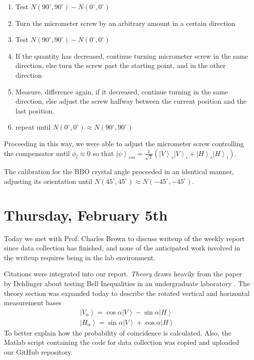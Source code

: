 \documentclass[letter,scriptaddress,twocolumn, prl,showkeys]{revtex4}
\newcommand{\ket}[1]{\left| #1 \right\rangle}
\newcommand{\degree}{^\circ}
\begin{document}
\begin{enumerate}
    \item Test $N(90 \degree, 90 \degree) - N(0\degree, 0\degree)$
    \item Turn the micrometer screw by an arbitrary amount in a certain direction
    \item Test $N(90 \degree, 90 \degree) - N(0\degree, 0\degree)$
    \item If the quantity has decreased, continue turning micrometer screw in the same direction, else turn the screw past the starting point, and in the other direction
    \item Measure, difference again, if it decreased, continue turning in the same direction, else adjust the screw halfway between the current position and the last position.
    \item repeat until $N(0^\circ, 0^\circ) \approx N(90^\circ, 90^\circ)$
\end{enumerate}

Proceeding in this way, we were able to adjust the micrometer screw controlling the compensator until $\phi_l \approx 0$ so that $\ket{\psi}_{em}=\frac{1}{\sqrt{2}} \left( \ket{V}_s\ket{V}_i+\ket{H}_s\ket{H}_i\right)$.

The calibration for the BBO crystal angle proceeded in an identical manner, adjusting its orientation until $N(45\degree, 45\degree)\approx N(-45 \degree, -45\degree)$.


\section{Thursday, February 5th}

Today we met with Prof. Charles Brown to discuss writeup of the weekly report since data collection has finished, and none of the anticipated work involved in the writeup requires being in the lab environment. 

Citations were integrated into our report. \textit{Theory} draws heavily from the paper by Dehlinger about testing Bell Inequalities in an undergraduate laboratory \cite{dehlinger_entangled_2002-1}. The theory section was expanded today to describe the rotated vertical and horizontal measurement bases 
\begin{align}
    \ket{V_\alpha} = \cos{\alpha}\ket{V}-\sin{\alpha}\ket{H} \\
    \ket{H_\alpha} = \sin{\alpha}\ket{V}+\cos{\alpha}\ket{H}
\end{align}
To better explain how the probability of coincidence is calculated. Also, the Matlab script containing the code for data collection was copied and uploaded our GitHub repository. 
\end{document}
